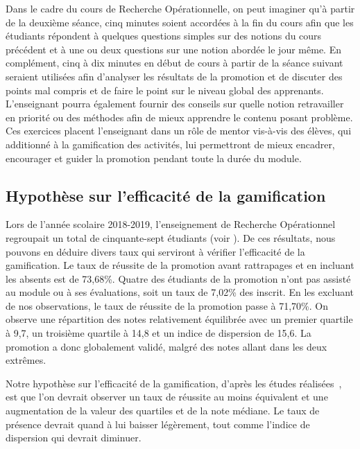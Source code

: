 Dans le cadre du cours de Recherche Opérationnelle, on peut imaginer qu'à partir de la deuxième séance, cinq minutes soient accordées à la fin du cours afin que les étudiants répondent à quelques questions simples sur des notions du cours précédent et à une ou deux questions sur une notion abordée le jour même. En complément, cinq à dix minutes en début de cours à partir de la séance suivant seraient utilisées afin d'analyser les résultats de la promotion et de discuter des points mal compris et de faire le point sur le niveau global des apprenants. L'enseignant pourra également fournir des conseils sur quelle notion retravailler en priorité ou des méthodes afin de mieux apprendre le contenu posant problème. Ces exercices placent l'enseignant dans un rôle de mentor vis-à-vis des élèves, qui additionné à la gamification des activités, lui permettront de mieux encadrer, encourager et guider la promotion pendant toute la durée du module.

\subsection{Hypothèse sur l'efficacité de la gamification}
Lors de l'année scolaire 2018-2019, l'enseignement de Recherche Opérationnel regroupait un total de cinquante-sept étudiants (voir ). De ces résultats, nous pouvons en déduire divers taux qui serviront à vérifier l'efficacité de la gamification. Le taux de réussite de la promotion avant rattrapages et en incluant les absents est de 73,68\%. Quatre des étudiants de la promotion n'ont pas assisté au module ou à ses évaluations, soit un taux de 7,02\% des inscrit. En les excluant de nos observations, le taux de réussite de la promotion passe à 71,70\%. On observe une répartition des notes relativement équilibrée avec un premier quartile à 9,7, un troisième quartile à 14,8 et un indice de dispersion de 15,6. La promotion a donc globalement validé, malgré des notes allant dans les deux extrêmes. \par

Notre hypothèse sur l'efficacité de la gamification, d'après les études réalisées~\cite{gamif-educ}, est que l'on devrait observer un taux de réussite au moins équivalent et une augmentation de la valeur des quartiles et de la note médiane. Le taux de présence devrait quand à lui baisser légèrement, tout comme l'indice de dispersion qui devrait diminuer.

